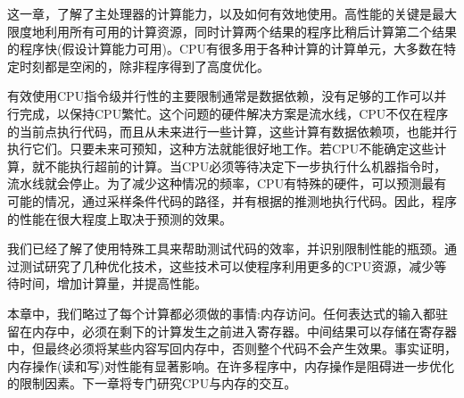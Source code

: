 这一章，了解了主处理器的计算能力，以及如何有效地使用。高性能的关键是最大限度地利用所有可用的计算资源，同时计算两个结果的程序比稍后计算第二个结果的程序快(假设计算能力可用)。CPU有很多用于各种计算的计算单元，大多数在特定时刻都是空闲的，除非程序得到了高度优化。

有效使用CPU指令级并行性的主要限制通常是数据依赖，没有足够的工作可以并行完成，以保持CPU繁忙。这个问题的硬件解决方案是流水线，CPU不仅在程序的当前点执行代码，而且从未来进行一些计算，这些计算有数据依赖项，也能并行执行它们。只要未来可预知，这种方法就能很好地工作。若CPU不能确定这些计算，就不能执行超前的计算。当CPU必须等待决定下一步执行什么机器指令时，流水线就会停止。为了减少这种情况的频率，CPU有特殊的硬件，可以预测最有可能的情况，通过采样条件代码的路径，并有根据的推测地执行代码。因此，程序的性能在很大程度上取决于预测的效果。

我们已经了解了使用特殊工具来帮助测试代码的效率，并识别限制性能的瓶颈。通过测试研究了几种优化技术，这些技术可以使程序利用更多的CPU资源，减少等待时间，增加计算量，并提高性能。

本章中，我们略过了每个计算都必须做的事情:内存访问。任何表达式的输入都驻留在内存中，必须在剩下的计算发生之前进入寄存器。中间结果可以存储在寄存器中，但最终必须将某些内容写回内存中，否则整个代码不会产生效果。事实证明，内存操作(读和写)对性能有显著影响。在许多程序中，内存操作是阻碍进一步优化的限制因素。下一章将专门研究CPU与内存的交互。







